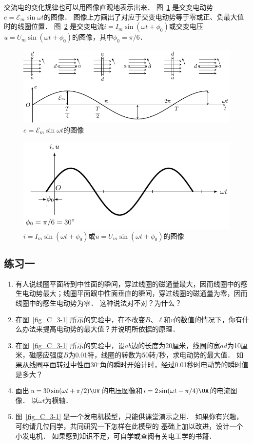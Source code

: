 	
交流电的变化规律也可以用图像直观地表示出来．
图~\ref{fig_C_3-4} 是交变电动势$e=\mathcal{E}_m \sin \omega t$的图像．
图像上方画出了对应于交变电动势等于零或正、负最大值时的线圈位置．
图~\ref{fig_C_3-5} 是交变电流$i=I_m\sin(\omega t+\phi_0)$或交变电压 $u=U_m\sin(\omega t+\phi_0)$的图像，其中$\phi_0=\pi/6$．
\begin{figure}[htbp]
    \centering
    \includegraphics{fig/C/3-4.pdf}
    \caption{$e=\mathcal{E}_m \sin \omega t$的图像}\label{fig_C_3-4}
\end{figure}
\begin{figure}[htbp]
    \centering
    \includegraphics{fig/C/3-5.pdf}
    \caption{$i=I_m\sin(\omega t+\phi_0)$或$u=U_m\sin(\omega t+\phi_0)$的图像}\label{fig_C_3-5}
\end{figure}



\subsection*{练习一}
\begin{enumerate}
    \item 有人说线圈平面转到中性面的瞬间，穿过线圈的磁通量最大，因而线圈中的感生电动势最大；线圈平面跟中性面垂直的瞬间，穿过线圈的磁通量为零，因而线圈中的感生电动势为零．
    这种说法对不对？为什么？
    \item 在图~\ref{fig_C_3-1} 所示的实验中，在不改变$B$、$\ell$和$v$的数值的情况下，你有什么办法来提高电动势的最大值？并说明所依据的原理．
    \item 在图~\ref{fig_C_3-1} 所示的实验中，设$ab$边的长度为20厘米，线圈的宽$ad$为10厘米，磁感应强度$B$为0.01特，线圈的转数为50转/秒，求电动势的最大值．
    如果从线圈平面转过中性面30$^\circ$角的瞬时开始计时，经过0.01秒时电动势的瞬时值是多大？
    \item 画出$u=30\sin(\omega t+\pi/2) \UV $的电压图像和$i=2\sin(\omega t-\pi/4) \UA $的电流图像．
    以$\omega t$为横轴．
    \item 图~\ref{fig_C_3-1} 是一个发电机模型，只能供课堂演示之用．
    如果你有兴趣，可约请几位同学，共同研究一下怎样在此模型的	
	基础上加以改进，设计一个小发电机．
	如果感到知识不足，可自学或查阅有关电工学的书籍．
\end{enumerate}


